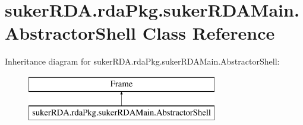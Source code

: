 \hypertarget{classsuker_r_d_a_1_1rda_pkg_1_1suker_r_d_a_main_1_1_abstractor_shell}{\section{suker\+R\+D\+A.\+rda\+Pkg.\+suker\+R\+D\+A\+Main.\+Abstractor\+Shell Class Reference}
\label{classsuker_r_d_a_1_1rda_pkg_1_1suker_r_d_a_main_1_1_abstractor_shell}
}
Inheritance diagram for suker\+R\+D\+A.\+rda\+Pkg.\+suker\+R\+D\+A\+Main.\+Abstractor\+Shell\+:\begin{figure}[H]
\begin{center}
\leavevmode
\includegraphics[height=2.000000cm]{classsuker_r_d_a_1_1rda_pkg_1_1suker_r_d_a_main_1_1_abstractor_shell}
\end{center}
\end{figure}
